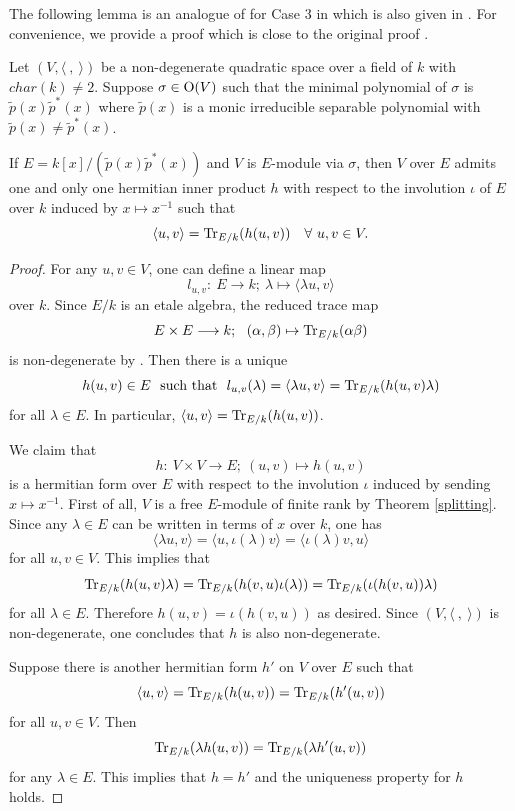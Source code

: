 \documentclass[12pt]{amsart}
\begin{document}
The following lemma is an analogue of \cite[Lemma 1.1]{Mil} for Case 3 in \cite[\S 3]{Mil} which is also given in \cite[Remark 2.10]{CHLX}. For convenience, we provide a proof which is close to the original proof \cite[Lemma 1.1]{Mil}.

\begin{lem} \label{hermitian} Let $(V,  \langle \  , \  \rangle)$ be a non-degenerate quadratic space over a field of $k$ with $char(k)\neq 2$. Suppose $\sigma \in {\rm O}(V)$ such that the minimal polynomial of $\sigma$ is $\tilde{p}(x) \tilde{p}^*(x)$ where $\tilde{p}(x)$ is a monic irreducible separable polynomial with $\tilde{p}(x) \neq \tilde{p}^*(x) $. 

If $E=k[x]/(\tilde{p}(x) \tilde{p}^*(x))$ and $V$ is $E$-module via $\sigma$, then $V$ over $E$ admits one and only one hermitian inner product $h$ with respect to the involution $\iota$ of $E$ over $k$ induced by $x\mapsto x^{-1}$ such that $$ \langle u  ,  v  \rangle = {\rm Tr}_{E/k} (h(u, v)) \ \ \ \forall \ u, v\in V. $$
\end{lem}
\begin{proof} For any $u, v\in V$, one can define a linear map 
$$ l_{u, v}: \ E  \longrightarrow k; \ \lambda \mapsto  \langle \lambda u, v \rangle  $$ over $k$. Since $E/k$ is an etale algebra, the reduced trace map
$$ E \times E \longrightarrow k; \ \ (\alpha, \beta) \mapsto {\rm Tr}_{E/k} (\alpha \beta) $$ is non-degenerate by \cite[(9.9) Theorem]{Reiner}.
 Then there is a unique $$h(u, v)\in E \ \ \text{such that} \ \  
 l_{u, v} (\lambda)= \langle \lambda u, v \rangle = {\rm Tr}_{E/k} (h(u, v)  \lambda) $$ for all $\lambda \in E$. In particular, $\langle u, v \rangle = {\rm Tr}_{E/k} (h(u, v))$. 

We claim that 
$$ h: \ V \times V  \longrightarrow E ; \ (u, v)\mapsto h(u, v) $$ is a hermitian form over $E$ with respect to the 
 involution $\iota$ induced by sending $x\mapsto x^{-1}$. First of all, $V$ is a free $E$-module of finite rank by Theorem \ref{splitting}.  Since any $\lambda\in E$ can be written in terms of $x$ over $k$, one has
$$ \langle \lambda u, v \rangle = \langle u, \iota (\lambda) v \rangle = \langle \iota (\lambda) v, u \rangle  $$
for all $u, v\in V$.  This implies that 
$$ {\rm Tr}_{E/k} (h(u, v)  \lambda) = {\rm Tr}_{E/k} (h(v, u) \iota( \lambda)) = {\rm Tr}_{E/k} (\iota (h(v, u))  \lambda) $$ for all $\lambda\in E$. Therefore $h(u, v)  = \iota (h(v, u))$ as desired. Since $(V,  \langle \  , \  \rangle)$ is non-degenerate, one concludes that $h$ is also non-degenerate. 

Suppose there is another hermitian form $h'$ on $V$ over $E$ such that $$\langle u, v \rangle = {\rm Tr}_{E/k} (h(u, v))={\rm Tr}_{E/k} (h'(u, v))$$ for all $u, v\in V$. Then 
$${\rm Tr}_{E/k} (\lambda h(u, v))={\rm Tr}_{E/k} (\lambda h'(u, v))$$ for any $\lambda\in E$. This implies that $h=h'$ and the uniqueness property for $h$ holds. 
\end{proof}
\end{document}
